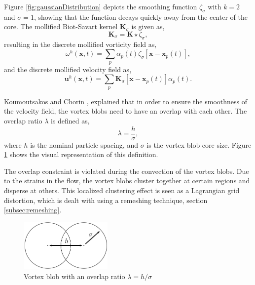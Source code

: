 Figure \ref{fig:gaussianDistribution} depicts the smoothing function $\zeta_{\sigma}$ with $k=2$ and $\sigma = 1$, showing that the function decays quickly away from the center of the core. The mollified Biot-Savart kernel $\mathbf{K}_{\sigma}$ is given as,	 
	\begin{equation}
	\mathbf{K}_{\sigma} = \mathbf{K} \star \zeta_{\sigma}, 
	\end{equation}
resulting in the discrete mollified vorticity field as,
	\begin{equation}
	\omega^h\left(\mathbf{x},t\right) = \sum_p \alpha_p\left(t\right)\zeta_{\sigma}\left[\mathbf{x}-\mathbf{x}_p\left(t\right)\right],
	\label{eq:mollifiedVorticityField}
	\end{equation}
and the discrete mollified velocity field as,
	\begin{equation}
	\mathbf{u}^h\left(\mathbf{x},t\right) = \sum_p \mathbf{K}_{\sigma}\left[\mathbf{x}-\mathbf{x}_p\left(t\right)\right]\alpha_p\left(t\right).
	\label{eq:mollifiedVelocityField}	
	\end{equation}

Koumoutsakos and Chorin \cite{Cottet2000a}, explained that in order to ensure the smoothness of the velocity field, the vortex blobs need to have an overlap with each other. The overlap ratio $\lambda$ is defined as,
	\begin{equation}
	\lambda = \frac{h}{\sigma},
	\label{eq:overlapRatio}
	\end{equation}
where $h$ is the nominal particle spacing, and $\sigma$ is the vortex blob core size. Figure \ref{fig:blobOverlap} shows the visual representation of this definition. 

The overlap constraint is violated during the convection of the vortex blobs. Due to the strains in the flow, the vortex blobs cluster together at certain regions and disperse at others. This localized clustering effect is seen as a Lagrangian grid distortion, which is dealt with using a remeshing technique, section \ref{subsec:remeshing}.

	\begin{figure}[!t]
	\centering
	\includegraphics[width=0.4\textwidth]{figures/lagrangian/blobOverlap.pdf}
	\caption{Vortex blob with an overlap ratio $\lambda = h/\sigma$}
	\label{fig:blobOverlap}
	\end{figure}

